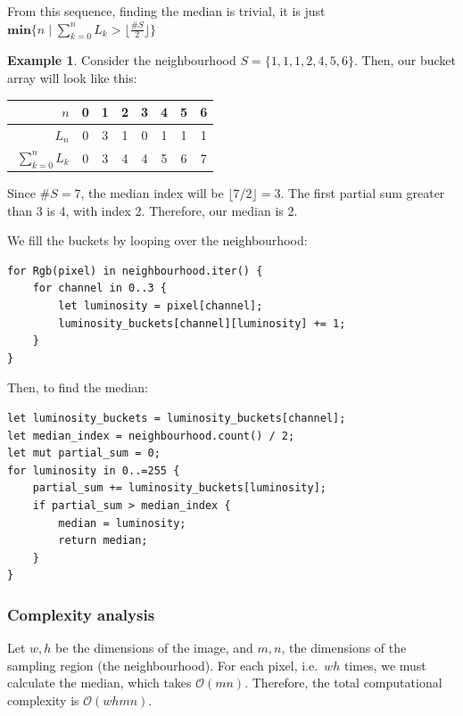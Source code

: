 \documentclass[12pt]{article}
\theoremstyle{definition}
\newtheorem*{example}{Example}
\begin{document}
From this sequence, finding the median is trivial, it is just $\mathbf{min}\big\{n \mid \sum_{k=0}^n L_k > \lfloor \frac{\#S}{2} \rfloor \big\}$

\begin{example}
Consider the neighbourhood $S = \{1,1,1,2,4,5,6\}$.
Then, our bucket array will look like this:
\begin{table}[H]\centering
    \begin{tabular}{|r|c|c|c|c|c|c|c|}
        \hline
        $\phantom{\big|}n$                & 0 & 1 & 2 & 3 & 4 & 5 & 6 \\ \hline
        $\phantom{\big|}L_n$              & 0 & 3 & 1 & 0 & 1 & 1 & 1 \\ \hline\hline
        $\phantom{\Big|}\sum_{k=0}^n L_k$ & 0 & 3 & 4 & 4 & 5 & 6 & 7 \\
        \hline
    \end{tabular}
\end{table}
Since $\#S = 7$, the median index will be $\lfloor 7/2 \rfloor = 3$.
The first partial sum greater than 3 is 4, with index 2. Therefore, our median is 2.
\end{example}

We fill the buckets by looping over the neighbourhood:
\begin{lstlisting}
for Rgb(pixel) in neighbourhood.iter() {
    for channel in 0..3 {
        let luminosity = pixel[channel];
        luminosity_buckets[channel][luminosity] += 1;
    }
}
\end{lstlisting}

Then, to find the median: 
\begin{lstlisting}
let luminosity_buckets = luminosity_buckets[channel];
let median_index = neighbourhood.count() / 2;
let mut partial_sum = 0;
for luminosity in 0..=255 {
    partial_sum += luminosity_buckets[luminosity];
    if partial_sum > median_index {
        median = luminosity;
        return median;
    }
}

\end{lstlisting}


\subsubsection{Complexity analysis}

Let $w,h$ be the dimensions of the image, and $m,n$, the dimensions of the sampling region (the neighbourhood).
For each pixel, i.e.\ $wh$ times, we must calculate the median, which takes $\mathcal{O}(mn)$.
Therefore, the total computational complexity is $\mathcal{O}(whmn)$.
\end{document}
